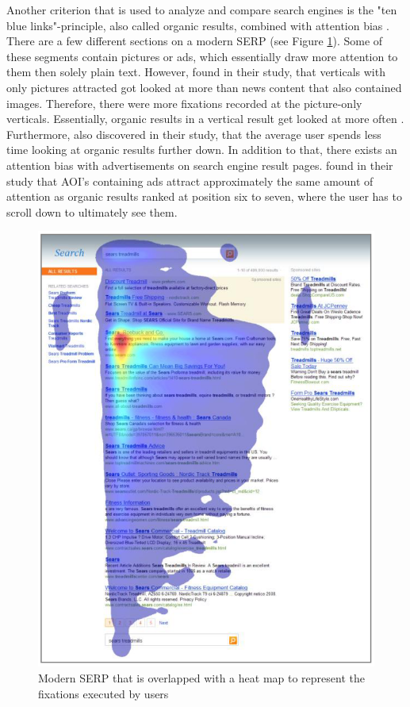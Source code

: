 Another criterion that is used to analyze and compare search engines is the "ten blue links"-principle, also called organic results, combined with attention bias \autocite{buscher2010good, liu2015influence}. There are a few different sections on a modern SERP (see Figure \ref{figure:Serp}). Some of these segments contain pictures or ads, which essentially draw more attention to them then solely plain text. 
However, \textcite{liu2015influence} found in their study, that verticals with only pictures attracted got looked at more than news content that also contained images. Therefore, there were more fixations recorded at the picture-only verticals. 
Essentially, organic results in a vertical result get looked at more often \autocite{wang2016beyond}.
Furthermore, \textcite{liu2015influence, buscher2010good} also discovered in their study, that the average user spends less time looking at organic results further down. In addition to that, there exists an attention bias with advertisements on search engine result pages. \textcite{buscher2010good} found in their study that AOI's containing ads attract approximately the same amount of attention as organic results ranked at position six to seven, where the user has to scroll down to ultimately see them.

\begin{figure}[!ht]
    \centering
    \includegraphics[width=1 \linewidth]{images/SERP_buscher2010good.png}
    \caption{
        Modern SERP that is overlapped with a heat map to represent the fixations executed by users \autocite[42]{buscher2010good}
    }
    \label{figure:Serp}
\end{figure}



